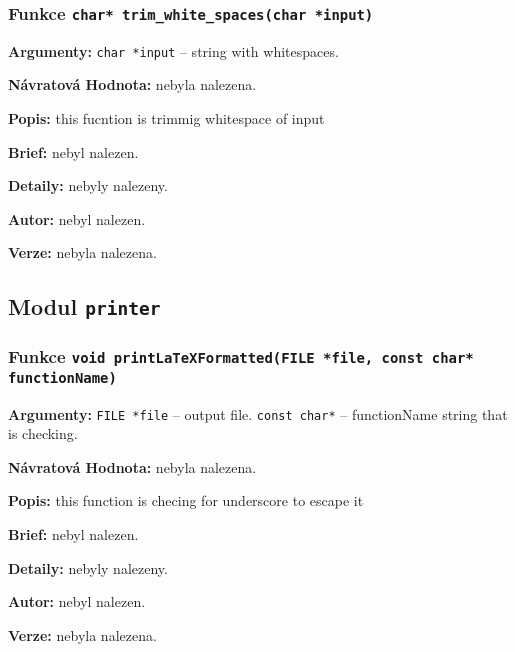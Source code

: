 \documentclass[12pt, a4paper]{article}
\begin{document}
\subsubsection{Funkce \texttt{char* trim\_white\_spaces(char *input)}}
\textbf{Argumenty: }\verb"char *input" -- string with whitespaces. \\
\par\noindent
\textbf{Návratová Hodnota: }nebyla nalezena.\\
\par\noindent
\textbf{Popis: }this fucntion is trimmig whitespace of input\\
\par\noindent
\textbf{Brief: }nebyl nalezen.\\
\par\noindent
\textbf{Detaily: }nebyly nalezeny.\\
\par\noindent
\textbf{Autor: }nebyl nalezen.\\
\par\noindent
\textbf{Verze: }nebyla nalezena.\\
\par\noindent
\subsection{Modul \texttt{printer}}
\subsubsection{Funkce \texttt{void printLaTeXFormatted(FILE *file, const char* functionName)}}
\textbf{Argumenty: }\verb"FILE *file" -- output file. \verb"const char*" -- functionName string that is checking. \\
\par\noindent
\textbf{Návratová Hodnota: }nebyla nalezena.\\
\par\noindent
\textbf{Popis: }this function is checing for underscore to escape it \\
\par\noindent
\textbf{Brief: }nebyl nalezen.\\
\par\noindent
\textbf{Detaily: }nebyly nalezeny.\\
\par\noindent
\textbf{Autor: }nebyl nalezen.\\
\par\noindent
\textbf{Verze: }nebyla nalezena.\\
\par\noindent
\end{document}
